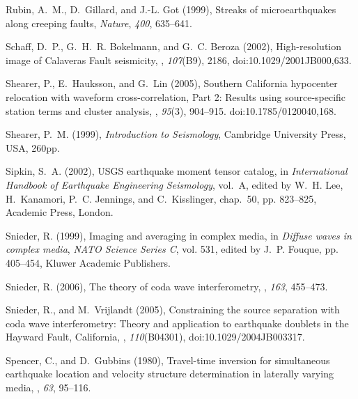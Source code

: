 \documentclass[12pt,double]{article}
\begin{document}
\begin{thebibliography}{45}
Rubin, A.~M., D.~Gillard, and J.-L. Got (1999), Streaks of microearthquakes
  along creeping faults, \textit{Nature}, \textit{400}, 635--641.

Schaff, D.~P., G.~H.~R. Bokelmann, and G.~C. Beroza (2002), High-resolution
  image of {C}alaveras {F}ault seismicity, \jgr, \textit{107}(B9), 2186, doi:10.1029/2001JB000,633.

Shearer, P., E.~Hauksson, and G.~Lin (2005), Southern {C}alifornia hypocenter
  relocation with waveform cross-correlation, {P}art 2: {R}esults using
  source-specific station terms and cluster analysis, \bssa, \textit{95}(3), 904--915.
  doi:10.1785/0120040,168.

Shearer, P.~M. (1999), \textit{Introduction to Seismology}, Cambridge
  University Press, USA, 260pp.

Sipkin, S.~A. (2002), {USGS} earthquake moment tensor catalog, in
  \textit{International Handbook of Earthquake Engineering Seismology},
  vol.~{A}, edited by W.~H. Lee, H.~Kanamori, P.~C. Jennings, and
  C.~Kisslinger, chap.~50, pp. 823--825, Academic Press, London.

Snieder, R. (1999), Imaging and averaging in complex media, in \textit{Diffuse
  waves in complex media}, \textit{NATO Science Series C}, vol. 531, edited by
  J.~P. Fouque, pp. 405--454, Kluwer Academic Publishers.

Snieder, R. (2006), The theory of coda wave interferometry, \pag, 
\textit{163}, 455--473.

Snieder, R., and M.~Vrijlandt (2005), Constraining the source separation with
  coda wave interferometry: Theory and application to earthquake doublets in
  the {H}ayward {F}ault, {C}alifornia, \jgr, \textit{110}(B04301), doi:10.1029/2004JB003317.

Spencer, C., and D.~Gubbins (1980), Travel-time inversion for simultaneous
  earthquake location and velocity structure determination in laterally varying
  media, \gjras,
  \textit{63}, 95--116.


\end{thebibliography}
\end{document}
